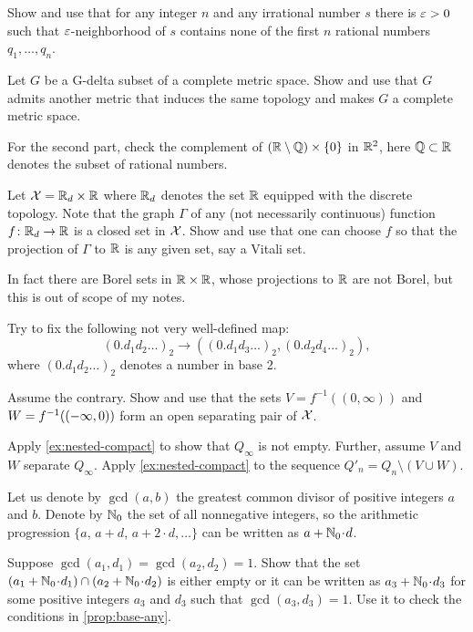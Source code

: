  Show and use that for any integer $n$ and any irrational number $s$ there is $\varepsilon>0$ such that $\varepsilon$-neighborhood of $s$ contains none of the first $n$ rational numbers $q_1,\ldots,q_n$.

Let $G$ be a G-delta subset of a complete metric space.
Show and use that $G$ admits another metric that induces the same topology and makes $G$ a complete metric space.

For the second part, check the complement of $(\mathbb{R}\setminus \mathbb{Q})\times \{0\}$ in $\mathbb{R}^2$,
here $\mathbb{Q}\subset\mathbb{R}$ denotes the subset of rational numbers.

Let $\mathcal{X}=\mathbb{R}_d\times \mathbb{R}$ where $\mathbb{R}_d$ denotes the set $\mathbb{R}$ equipped with the discrete topology.
Note that the graph $\Gamma$ of any (not necessarily continuous) function $f\colon\mathbb{R}_d\to \mathbb{R}$ is a closed set in $\mathcal{X}$.
Show and use that one can choose $f$ so that the projection of $\Gamma$ to $\mathbb{R}$ is any given set, say a Vitali set.

In fact there are Borel sets in $\mathbb{R}\times \mathbb{R}$, whose projections to $\mathbb{R}$ are not Borel, but this is out of scope of my notes.

Try to fix the following not very well-defined map:
\[(0.d_1d_2\ldots)_2\to ((0.d_1d_3\ldots)_2,(0.d_2d_4\ldots)_2),\]
where $(0.d_1d_2\ldots)_2$ denotes a number in base 2.


Assume the contrary.
Show and use that the sets $V=f^{-1}((0,\infty))$ and $W\z=f^{-1}((-\infty,0))$ form an open separating pair of $\mathcal{X}$.

Apply \ref{ex:nested-compact} to show that $Q_\infty$ is not empty.
Further, assume $V$ and $W$ separate $Q_\infty$.
Apply \ref{ex:nested-compact} to the sequence $Q'_n=Q_n\setminus(V\cup W)$.

Let us denote by $\gcd(a,b)$ the greatest common divisor of positive integers $a$ and $b$.
Denote by $\mathbb{N}_0$ the set of all nonnegative integers,
so the arithmetic progression  $\{a$, $a+d$, $a+2\cdot d,\ldots\}$ can be written as $a+\NN_0\cdot d$.

Suppose $\gcd(a_1,d_1)=\gcd(a_2,d_2)=1$.
Show that the set $(a_1+\NN_0\cdot d_1)\cap(a_2+\NN_0\cdot d_2)$ is either empty or it can be written as $a_3+\NN_0\cdot d_3$ for some positive integers $a_3$ and $d_3$ such that $\gcd(a_3,d_3)=1$.
Use it to check the conditions in \ref{prop:base-any}.

